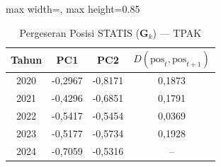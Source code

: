 \begin{table}[H]
\centering
\caption{Pergeseran Posisi STATIS ($\mathbf{G}_k$) --- TPAK} \label{tab:app2jarak_statis_loading_tpak}
\begin{adjustbox}{max width=\textwidth, max height=0.85\textheight}
\begin{tabular}{|c|c|c|c|}
\hline
\textbf{Tahun} & \textbf{PC1} & \textbf{PC2} & \textbf{$D(\text{pos}_t, \text{pos}_{t+1})$} \\
\hline
2020 & -0,2967 & -0,8171 & 0,1873 \\
2021 & -0,4296 & -0,6851 & 0,1791 \\
2022 & -0,5417 & -0,5454 & 0,0369 \\
2023 & -0,5177 & -0,5734 & 0,1928 \\
2024 & -0,7059 & -0,5316 & -- \\
\hline
\end{tabular}
\end{adjustbox}
\end{table}